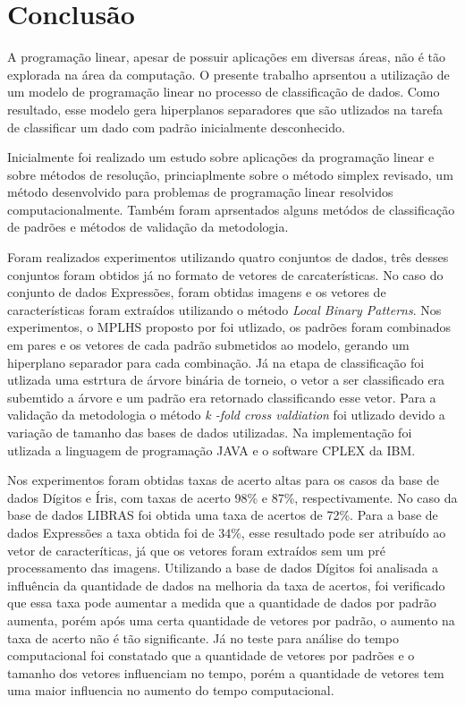 \chapter{Conclusão}

A programação linear, apesar de possuir aplicações em diversas áreas, não é tão explorada na área da computação. O presente trabalho aprsentou a utilização de um modelo de programação linear no processo de classificação de dados. Como resultado, esse modelo gera hiperplanos separadores que são utlizados na tarefa de classificar um dado com padrão inicialmente desconhecido.

Inicialmente foi realizado um estudo sobre aplicações da programação linear e sobre métodos de resolução, princiaplmente sobre o método simplex revisado, um método desenvolvido para problemas de programação linear resolvidos computacionalmente. Também foram aprsentados alguns metódos de classificação de padrões e métodos de validação da metodologia.

Foram realizados experimentos utilizando quatro conjuntos de dados, três desses conjuntos foram obtidos já no formato de vetores de carcaterísticas. No caso do conjunto de dados Expressões, foram obtidas imagens e os vetores de características foram extraídos utilizando o método \textit{Local Binary Patterns}. Nos experimentos, o MPLHS proposto por  foi utlizado, os padrões foram combinados em pares e os vetores de cada padrão submetidos ao modelo, gerando um hiperplano separador para cada combinação. Já na etapa de classificação foi utlizada uma estrtura de árvore binária de torneio, o vetor a ser classificado era subemtido a árvore e um padrão era retornado classificando esse vetor. Para a validação da metodologia  o método \textit{k -fold cross valdiation} foi utlizado devido a variação de tamanho das bases de dados utilizadas. Na implementação foi utlizada a linguagem de programação JAVA e o software CPLEX da IBM.

Nos experimentos foram obtidas taxas de acerto altas para os casos da base de dados Dígitos e Íris, com taxas de acerto 98\% e 87\%, respectivamente. No caso da base de dados LIBRAS foi obtida uma taxa de acertos de 72\%. Para a base de dados Expressões a taxa obtida foi de 34\%, esse resultado pode ser atribuído ao vetor de caracteríticas, já que os vetores foram extraídos sem um pré processamento das imagens. Utilizando a base de dados Dígitos foi analisada a influência da quantidade de dados na melhoria da taxa de acertos, foi verificado que essa taxa pode aumentar a medida que a quantidade de dados por padrão aumenta, porém após uma certa quantidade de vetores por padrão, o aumento na taxa de acerto não é tão significante. Já no teste para análise do tempo computacional foi constatado que a quantidade de vetores por padrões e o tamanho dos vetores influenciam no tempo, porém a quantidade de vetores tem uma maior influencia no aumento do tempo computacional.

